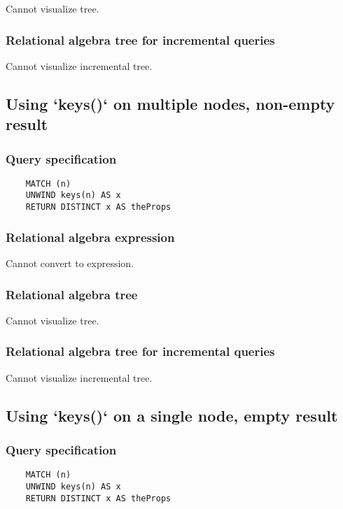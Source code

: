 	Cannot visualize tree.

	\subsubsection*{Relational algebra tree for incremental queries}

	Cannot visualize incremental tree.
	\subsection{Using `keys()` on multiple nodes, non-empty result}

	\subsubsection*{Query specification}

	\begin{lstlisting}
	MATCH (n)
	UNWIND keys(n) AS x
	RETURN DISTINCT x AS theProps
	\end{lstlisting}


	\subsubsection*{Relational algebra expression}

	Cannot convert to expression.

	\subsubsection*{Relational algebra tree}

	Cannot visualize tree.

	\subsubsection*{Relational algebra tree for incremental queries}

	Cannot visualize incremental tree.
	\subsection{Using `keys()` on a single node, empty result}

	\subsubsection*{Query specification}

	\begin{lstlisting}
	MATCH (n)
	UNWIND keys(n) AS x
	RETURN DISTINCT x AS theProps
	\end{lstlisting}


